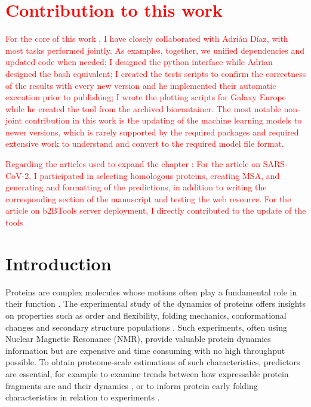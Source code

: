 \section*{\textcolor{red}{Contribution to this work}}
\textcolor{red}{For the core of this work \cite{gavalda-garcia_bio2byte_2024}, I have closely collaborated with Adrián Díaz, with most tasks performed jointly. As examples, together, we unified dependencies and updated code when needed; I designed the python interface while Adrian designed the bash equivalent; I created the tests scripts to confirm the correctness of the results with every new version and he implemented their automatic execution prior to publishing; I wrote the plotting scripts for Galaxy Europe while he created the tool from the archived biocontainer. The most notable non-joint contribution in this work is the updating of the machine learning models to newer versions, which is rarely supported by the required packages and required extensive work to understand and convert to the required model file format.}

\textcolor{red}{Regarding the articles used to expand the chapter \cite{kagami_online_2021, kagami_b2btools_2021}: For the article on SARS-CoV-2, I participated in selecting homologous proteins, creating MSA, and generating and formatting of the predictions, in addition to writing the corresponding section of the manuscript and testing the web resource. For the article on b2BTools server deployment, I directly contributed to the update of the tools}



\newpage
\section{Introduction}

Proteins are complex molecules whose motions often play a fundamental role in their function \cite{fenwick_integrated_2014, campbell_role_2016}. The experimental study of the dynamics of proteins offers insights on properties such as order and flexibility, folding mechanics, conformational changes and secondary structure populations \cite{berjanskii_nmr_2006, eaton_modern_2021}. Such experiments, often using Nuclear Magnetic Resonance (NMR), provide valuable protein dynamics information but are expensive and time consuming with no high throughput possible. To obtain \gls{proteome}-scale estimations of such characteristics, predictors are essential, for example to examine trends between how expressable protein fragments are and their dynamics \cite{boone_massively_2021}, or to inform protein early folding characteristics in relation to experiments  \cite{smets_evolutionary_2022}.

